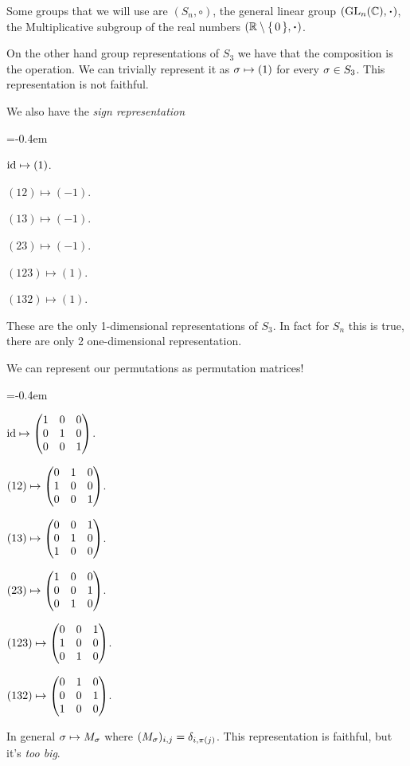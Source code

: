 \documentclass[12pt]{memoir}
\begin{document}
\begin{Ex}
    Some groups that we will use are $(S_n,\circ)$, the general linear group $(\GL_n(\bC),\.)$, the Multiplicative subgroup of the real numbers $(\bR\less\set{0},\.)$.\par 
    On the other hand group representations of $S_3$ we have that the composition is the operation. We can trivially represent it as $\sigma\mapsto (1)$ for every $\sigma\in S_3$. This representation is not faithful.\par 
    We also have the \emph{sign representation} 
    \begin{itemize}\begin{multicols}{3}
        \itemsep=-0.4em
\item $\operatorname{id}\mapsto (1)$.     
\item $(12)\mapsto (-1)$.       
\item $(13)\mapsto (-1)$.       
\item $(23)\mapsto (-1)$.       
\item $(123)\mapsto (1)$.       
\item $(132)\mapsto (1)$.        
    \end{multicols}
    \end{itemize}
    These are the only 1-dimensional representations of $S_3$. In fact for $S_n$ this is true, there are only 2 one-dimensional representation.\par 
    We can represent our permutations as permutation matrices!
    \begin{itemize}\begin{multicols}{3}
        \itemsep=-0.4em
\item $\operatorname{id}\mapsto \begin{pmatrix} 1 & 0 & 0 \\ 0 & 1 & 0 \\ 0 & 0 & 1 \end{pmatrix}$.     
\item $(12)\mapsto \begin{pmatrix} 0 & 1 & 0 \\ 1 & 0 & 0 \\ 0 & 0 & 1 \end{pmatrix}$.       
\item $(13)\mapsto \begin{pmatrix} 0 & 0 & 1 \\ 0 & 1 & 0 \\ 1 & 0 & 0 \end{pmatrix}$.       
\item $(23)\mapsto \begin{pmatrix} 1 & 0 & 0 \\ 0 & 0 & 1 \\ 0 & 1 & 0 \end{pmatrix}$.        
\item $(123)\mapsto\begin{pmatrix} 0 & 0 & 1 \\ 1 & 0 & 0 \\ 0 & 1 & 0 \end{pmatrix}$.       
\item $(132)\mapsto \begin{pmatrix} 0 & 1 & 0 \\ 0 & 0 & 1 \\ 1 & 0 & 0 \end{pmatrix}$.        
    \end{multicols}
    \end{itemize}
    In general $\sigma\mapsto M_\sigma$ where $(M_\sigma)_{i,j}=\delta_{i,\pi(j)}$. This representation is faithful, but it's \emph{too big}.
\end{Ex}
\end{document}
